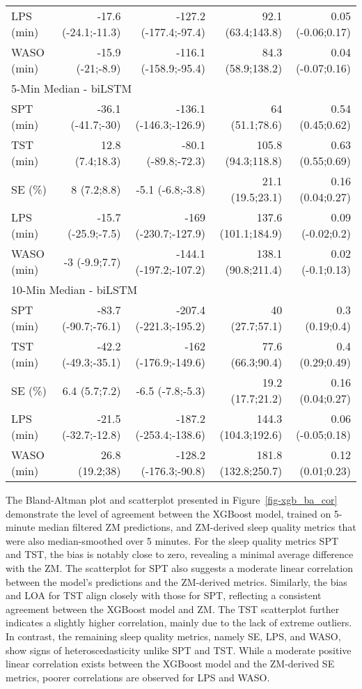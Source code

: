 \documentclass[
  10pt,
]{scrbook}
\begin{document}
\begin{longtable}{lrrrr}
LPS (min) & -17.6 (-24.1;-11.3) & -127.2 (-177.4;-97.4) & 92.1 (63.4;143.8) & 0.05 (-0.06;0.17) \\ 
WASO (min) & -15.9 (-21;-8.9) & -116.1 (-158.9;-95.4) & 84.3 (58.9;138.2) & 0.04 (-0.07;0.16) \\ 
\midrule
\multicolumn{5}{l}{5-Min Median - biLSTM} \\ 
\midrule
SPT (min) & -36.1 (-41.7;-30) & -136.1 (-146.3;-126.9) & 64 (51.1;78.6) & 0.54 (0.45;0.62) \\ 
TST (min) & 12.8 (7.4;18.3) & -80.1 (-89.8;-72.3) & 105.8 (94.3;118.8) & 0.63 (0.55;0.69) \\ 
SE (\%) & 8 (7.2;8.8) & -5.1 (-6.8;-3.8) & 21.1 (19.5;23.1) & 0.16 (0.04;0.27) \\ 
LPS (min) & -15.7 (-25.9;-7.5) & -169 (-230.7;-127.9) & 137.6 (101.1;184.9) & 0.09 (-0.02;0.2) \\ 
WASO (min) & -3 (-9.9;7.7) & -144.1 (-197.2;-107.2) & 138.1 (90.8;211.4) & 0.02 (-0.1;0.13) \\ 
\midrule
\multicolumn{5}{l}{10-Min Median - biLSTM} \\ 
\midrule
SPT (min) & -83.7 (-90.7;-76.1) & -207.4 (-221.3;-195.2) & 40 (27.7;57.1) & 0.3 (0.19;0.4) \\ 
TST (min) & -42.2 (-49.3;-35.1) & -162 (-176.9;-149.6) & 77.6 (66.3;90.4) & 0.4 (0.29;0.49) \\ 
SE (\%) & 6.4 (5.7;7.2) & -6.5 (-7.8;-5.3) & 19.2 (17.7;21.2) & 0.16 (0.04;0.27) \\ 
LPS (min) & -21.5 (-32.7;-12.8) & -187.2 (-253.4;-138.6) & 144.3 (104.3;192.6) & 0.06 (-0.05;0.18) \\ 
WASO (min) & 26.8 (19.2;38) & -128.2 (-176.3;-90.8) & 181.8 (132.8;250.7) & 0.12 (0.01;0.23) \\ 
\bottomrule
\end{longtable}

\endgroup

The Bland-Altman plot and scatterplot presented in
Figure~\ref{fig-xgb_ba_cor} demonstrate the level of agreement between
the XGBoost model, trained on 5-minute median filtered ZM predictions,
and ZM-derived sleep quality metrics that were also median-smoothed over
5 minutes. For the sleep quality metrics SPT and TST, the bias is
notably close to zero, revealing a minimal average difference with the
ZM. The scatterplot for SPT also suggests a moderate linear correlation
between the model's predictions and the ZM-derived metrics. Similarly,
the bias and LOA for TST align closely with those for SPT, reflecting a
consistent agreement between the XGBoost model and ZM. The TST
scatterplot further indicates a slightly higher correlation, mainly due
to the lack of extreme outliers. In contrast, the remaining sleep
quality metrics, namely SE, LPS, and WASO, show signs of
heteroscedasticity unlike SPT and TST. While a moderate positive linear
correlation exists between the XGBoost model and the ZM-derived SE
metrics, poorer correlations are observed for LPS and WASO.
\end{document}

